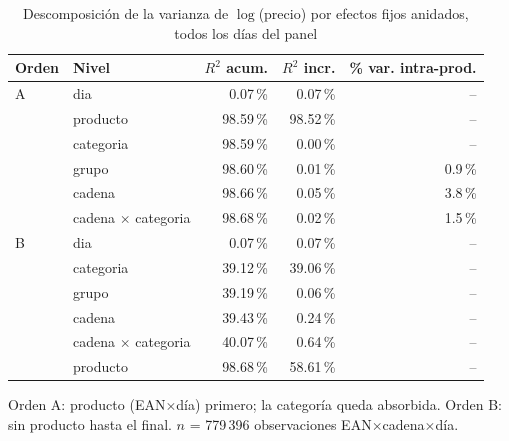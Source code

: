 \begin{table}[htbp]
\caption{Descomposici\'on de la varianza de $\log$(precio) por efectos fijos anidados, todos los d\'ias del panel}
\label{tab:varianza}
\centering\scriptsize\setlength{\tabcolsep}{3pt}
\begin{tabular}{@{}llrrr@{}}
\toprule
Orden & Nivel & $R^2$ acum. & $R^2$ incr. & \% var. intra-prod. \\
\midrule
A & dia & 0.07\,\% & 0.07\,\% & -- \\
 & producto & 98.59\,\% & 98.52\,\% & -- \\
 & categoria & 98.59\,\% & 0.00\,\% & -- \\
 & grupo & 98.60\,\% & 0.01\,\% & 0.9\,\% \\
 & cadena & 98.66\,\% & 0.05\,\% & 3.8\,\% \\
 & cadena $\times$ categoria & 98.68\,\% & 0.02\,\% & 1.5\,\% \\
\midrule
B & dia & 0.07\,\% & 0.07\,\% & -- \\
 & categoria & 39.12\,\% & 39.06\,\% & -- \\
 & grupo & 39.19\,\% & 0.06\,\% & -- \\
 & cadena & 39.43\,\% & 0.24\,\% & -- \\
 & cadena $\times$ categoria & 40.07\,\% & 0.64\,\% & -- \\
 & producto & 98.68\,\% & 58.61\,\% & -- \\
\bottomrule\end{tabular}
\par\smallskip\raggedright\scriptsize Orden A: producto (EAN$\times$d\'ia) primero; la categor\'ia queda absorbida. Orden B: sin producto hasta el final. $n$ = 779\,396 observaciones EAN$\times$cadena$\times$d\'ia.
\end{table}
